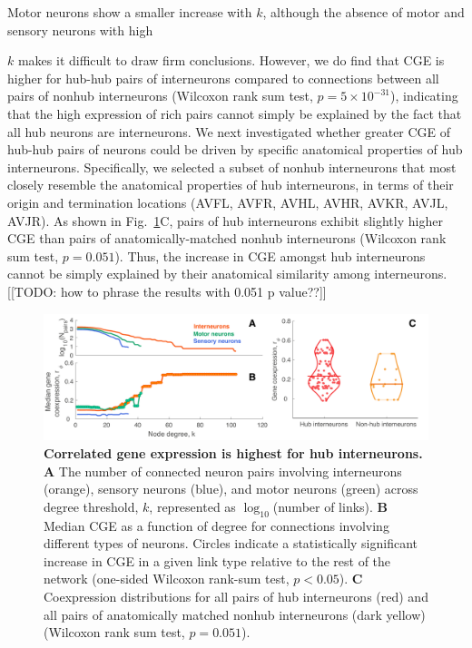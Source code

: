\documentclass[10pt,letterpaper]{article}
\begin{document}
Motor neurons show a smaller increase with $k$, although the absence of motor and sensory neurons with high {$k$ makes it difficult to draw firm conclusions.
However, we do find that CGE is higher for hub-hub pairs of interneurons compared to connections between all pairs of nonhub interneurons (Wilcoxon rank sum test, $p = 5 \times 10^{-31}$), indicating that the high expression of rich pairs cannot simply be explained by the fact that all hub neurons are interneurons.
We next investigated whether greater CGE of hub-hub pairs of neurons could be driven by specific anatomical properties of hub interneurons.
Specifically, we selected a subset of nonhub interneurons that most closely resemble the anatomical properties of hub interneurons, in terms of their origin and termination locations (AVFL, AVFR, AVHL, AVHR, AVKR, AVJL, AVJR).
As shown in Fig.~\ref{fig:interneuron_dep}C, pairs of hub interneurons exhibit slightly higher CGE than pairs of anatomically-matched nonhub interneurons (Wilcoxon rank sum test, $p = 0.051$).
Thus, the increase in CGE amongst hub interneurons cannot be simply explained by their anatomical similarity among interneurons.[[TODO: how to phrase the results with 0.051 p value??]]

\begin{figure}[h]
\centering
   \includegraphics[width=1\textwidth]{Type_Degree5.pdf}
 \caption{
\textbf{Correlated gene expression is highest for hub interneurons.}
\textbf{A} The number of connected neuron pairs involving interneurons (orange), sensory neurons (blue), and motor neurons (green) across degree threshold, $k$, represented as $\log_{10}$(number of links).
\textbf{B} Median CGE as a function of degree for connections involving different types of neurons.
Circles indicate a statistically significant increase in CGE in a given link type relative to the rest of the network (one-sided Wilcoxon rank-sum test, $p < 0.05$).
\textbf{C} Coexpression distributions for all pairs of hub interneurons (red) and all pairs of anatomically matched nonhub interneurons (dark yellow) (Wilcoxon rank sum test, $p = 0.051$).
}
 \label{fig:interneuron_dep}
\end{figure}

}
\end{document}
